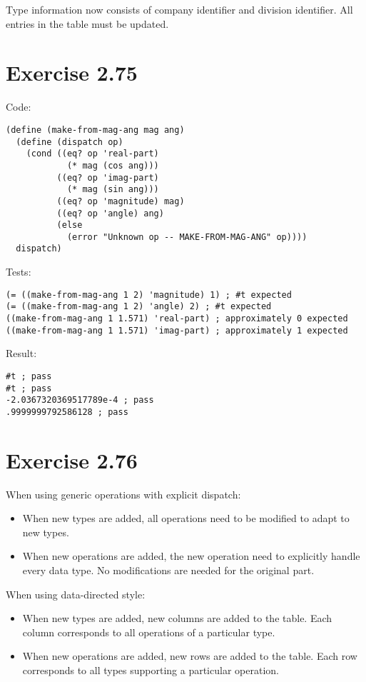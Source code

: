 \documentclass[../main.tex]{subfiles}
\begin{document}
Type information now consists of company identifier
 and division identifier. All entries in the table
 must be updated.

\section{Exercise 2.75}

Code:

\begin{lstlisting}
(define (make-from-mag-ang mag ang)
  (define (dispatch op)
    (cond ((eq? op 'real-part) 
            (* mag (cos ang)))
          ((eq? op 'imag-part)
            (* mag (sin ang)))
          ((eq? op 'magnitude) mag)
          ((eq? op 'angle) ang)
          (else
            (error "Unknown op -- MAKE-FROM-MAG-ANG" op))))
  dispatch)
\end{lstlisting}

Tests:

\begin{lstlisting}
(= ((make-from-mag-ang 1 2) 'magnitude) 1) ; #t expected
(= ((make-from-mag-ang 1 2) 'angle) 2) ; #t expected
((make-from-mag-ang 1 1.571) 'real-part) ; approximately 0 expected
((make-from-mag-ang 1 1.571) 'imag-part) ; approximately 1 expected
\end{lstlisting}

Result:

\begin{lstlisting}
#t ; pass
#t ; pass
-2.0367320369517789e-4 ; pass
.9999999792586128 ; pass
\end{lstlisting}

\section{Exercise 2.76}

When using generic operations with explicit
 dispatch:

\begin{itemize}
\item When new types are added, all
 operations need to be modified to adapt to
 new types.
\item When new operations are added, the
 new operation need to explicitly handle
 every data type. No modifications are
 needed for the original part.
\end{itemize}

When using data-directed style:

\begin{itemize}
\item When new types are added, new columns
 are added to the table. Each column corresponds to
 all operations of a particular type.
\item When new operations are added, new
 rows are added to the table. Each row corresponds to
 all types supporting a particular operation.
\end{itemize}
\end{document}
